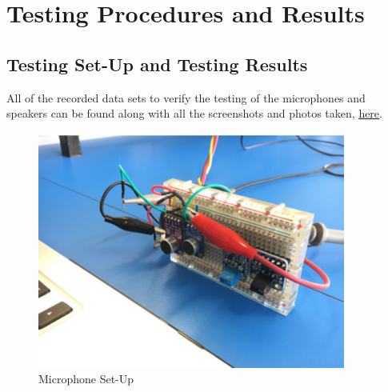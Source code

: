\newpage

\chapter{Testing Procedures and Results}\label{chap:Testing}

\section{Testing Set-Up and Testing Results}
All of the recorded data sets to verify the testing of the microphones and speakers can be found along with all the screenshots and photos taken, \href{https://github.com/DewanPieterse/AudioRadar/tree/master/Matlab}{\underline{here}}. 

\begin{figure}[h!]
    \centering
    \begin{minipage}{0.45\textwidth}
        \centering
        \includegraphics[width = 0.9\textwidth]{images/mic.pdf}
    \caption{Microphone Set-Up}\label{fig:mic}
    \end{minipage}\hfill
    \begin{minipage}{0.45\textwidth}
        \centering

\end{minipage}
\end{figure}
